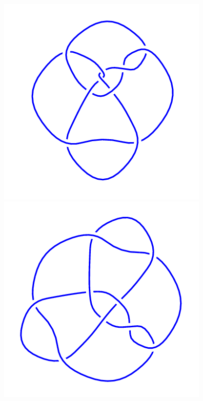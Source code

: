 \begin{figure}[H]
\begin{minipage}[b]{.18\linewidth}
	\end{minipage}
	\begin{minipage}[b]{.18\linewidth}
		\centering
		\includegraphics[width=\linewidth]{../data/9_38.png}
	\end{minipage}
	\begin{minipage}[b]{.18\linewidth}
		\centering
		\includegraphics[width=\linewidth]{../data/9_39.png}

\end{minipage}
\end{figure}
